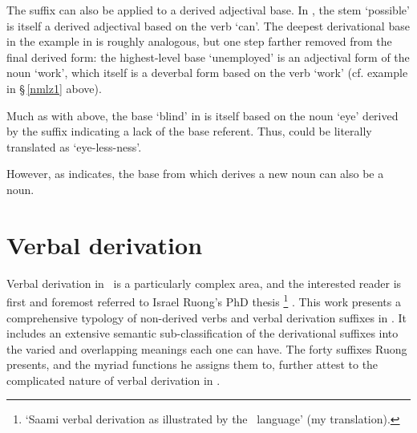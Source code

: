 The suffix  can also be applied to a derived adjectival base. In , the stem  ‘possible’ is itself a derived adjectival based on the verb  ‘can’. The deepest derivational base in the example in  is roughly analogous, but one step farther removed from the final derived form: the highest-level base  ‘unemployed’ is an adjectival form of the noun  ‘work’, which itself is a deverbal form based on the verb  ‘work’ (cf. example  in §\,\ref{nmlz1} above). 
\ea\label{vuohtaEx5}
\z
\ea\label{vuohtaEx6}
\z

Much as with  above, the base  ‘blind’ in  is itself based on the noun  ‘eye’ derived by the suffix  indicating a lack of the base referent. Thus,  could be literally translated as ‘eye-less-ness’. 
\ea\label{vuohtaEx7}
\z

However, as  indicates, the base from which  derives a new noun can also be a noun. 
\ea\label{vuohtaEx4}
\z



\section{Verbal derivation}\label{vDerivation}%
Verbal derivation in \PS\ is a particularly complex area, and the interested reader is first and foremost referred to Israel Ruong’s PhD thesis \footnote{‘Saami verbal derivation as illustrated by the \PS\ language’ (my translation).} 
\citep{Ruong1943}. This work presents a comprehensive typology of non-derived verbs and verbal derivation suffixes in \PS. %
It includes an extensive semantic sub-classification of the derivational suffixes into the varied and overlapping meanings each one can have. The forty suffixes Ruong presents, and the myriad functions he assigns them to, further attest to the complicated nature of verbal derivation in \PS. 

